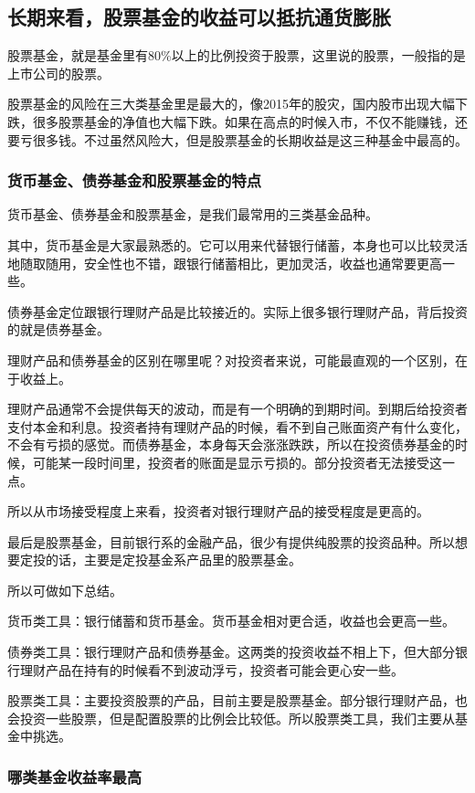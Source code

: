\subsection{长期来看，股票基金的收益可以抵抗通货膨胀}
股票基金，就是基金里有80\%以上的比例投资于股票，这里说的股票，一般指的是上市公司的股票。

股票基金的风险在三大类基金里是最大的，像2015年的股灾，国内股市出现大幅下跌，很多股票基金的净值也大幅下跌。如果在高点的时候入市，不仅不能赚钱，还要亏很多钱。不过虽然风险大，但是股票基金的长期收益是这三种基金中最高的。

\subsubsection{货币基金、债券基金和股票基金的特点}

货币基金、债券基金和股票基金，是我们最常用的三类基金品种。

其中，货币基金是大家最熟悉的。它可以用来代替银行储蓄，本身也可以比较灵活地随取随用，安全性也不错，跟银行储蓄相比，更加灵活，收益也通常要更高一些。

债券基金定位跟银行理财产品是比较接近的。实际上很多银行理财产品，背后投资的就是债券基金。

理财产品和债券基金的区别在哪里呢？对投资者来说，可能最直观的一个区别，在于收益上。

理财产品通常不会提供每天的波动，而是有一个明确的到期时间。到期后给投资者支付本金和利息。投资者持有理财产品的时候，看不到自己账面资产有什么变化，不会有亏损的感觉。而债券基金，本身每天会涨涨跌跌，所以在投资债券基金的时候，可能某一段时间里，投资者的账面是显示亏损的。部分投资者无法接受这一点。

所以从市场接受程度上来看，投资者对银行理财产品的接受程度是更高的。

最后是股票基金，目前银行系的金融产品，很少有提供纯股票的投资品种。所以想要定投的话，主要是定投基金系产品里的股票基金。

所以可做如下总结。

货币类工具：银行储蓄和货币基金。货币基金相对更合适，收益也会更高一些。

债券类工具：银行理财产品和债券基金。这两类的投资收益不相上下，但大部分银行理财产品在持有的时候看不到波动浮亏，投资者可能会更心安一些。

股票类工具：主要投资股票的产品，目前主要是股票基金。部分银行理财产品，也会投资一些股票，但是配置股票的比例会比较低。所以股票类工具，我们主要从基金中挑选。

\subsubsection{哪类基金收益率最高}


